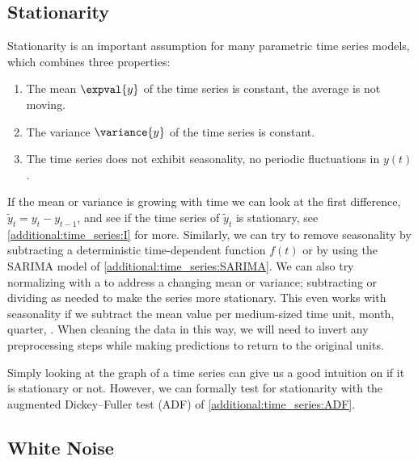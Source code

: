 \subsection{Stationarity}
\label{additional:time_series:stationarity}

Stationarity is an important assumption for many parametric time series models,
which combines three properties:

\begin{enumerate}[noitemsep]
  \item The mean $\expval{y}$ of the time series is constant, \ie the average is not moving.\label{item:time_series:stationarity:constant_mean}
  \item The variance $\variance{y}$ of the time series is constant.\label{item:time_series:stationarity:constant_var}
  \item The time series does not exhibit seasonality, \ie no periodic fluctuations in $y\left(t\right)$.\label{item:time_series:stationarity:seasonality}
\end{enumerate}

If the mean or variance is growing with time
we can look at the first difference, $\widetilde{y}_{t} = y_{t} - y_{t-1}$,
and see if the time series of $\widetilde{y}_{t}$ is stationary,
see \cref{additional:time_series:I} for more.
Similarly, we can try to remove seasonality
by subtracting a deterministic time-dependent function $f\left(t\right)$
or by using the SARIMA model of \cref{additional:time_series:SARIMA}.
We can also try normalizing with a \Zscore to address a changing mean or variance;
subtracting or dividing as needed to make the series more stationary.
This even works with seasonality if we subtract the mean value per medium-sized time unit, \eg month, quarter, \etc.
When cleaning the data in this way,
we will need to invert any preprocessing steps
while making predictions to return to the original units.

Simply looking at the graph of a time series can give us
a good intuition on if it is stationary or not.
However, we can formally test for stationarity
with the augmented Dickey--Fuller test (ADF) of \cref{additional:time_series:ADF}.

\subsection{White Noise}
\label{additional:time_series:white_noise}

